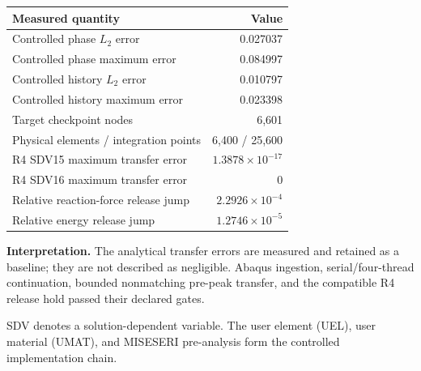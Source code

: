 \documentclass[11pt,a4paper]{article}
\newcommand{\boxx}[2]{\noindent\colorbox{#1}{\parbox{\dimexpr\linewidth-2\fboxsep}{#2}}}
\begin{document}
\vspace{4mm}
\begin{tabularx}{\linewidth}{@{}Xr@{}}
\toprule
\textbf{Measured quantity} & \textbf{Value}\\ \midrule
Controlled phase $L_2$ error & 0.027037\\
Controlled phase maximum error & 0.084997\\
Controlled history $L_2$ error & 0.010797\\
Controlled history maximum error & 0.023398\\
Target checkpoint nodes & 6,601\\
Physical elements / integration points & 6,400 / 25,600\\
R4 SDV15 maximum transfer error & $1.3878\times10^{-17}$\\
R4 SDV16 maximum transfer error & 0\\
Relative reaction-force release jump & $2.2926\times10^{-4}$\\
Relative energy release jump & $1.2746\times10^{-5}$\\ \bottomrule
\end{tabularx}

\vspace{4mm}
\boxx{paleamber}{\textbf{Interpretation.} The analytical transfer errors are measured and retained as a baseline; they are not described as negligible. Abaqus ingestion, serial/four-thread continuation, bounded nonmatching pre-peak transfer, and the compatible R4 release hold passed their declared gates.}
\vfill
\footnotesize SDV denotes a solution-dependent variable. The user element (UEL), user material (UMAT), and MISESERI pre-analysis form the controlled implementation chain.
\end{document}
